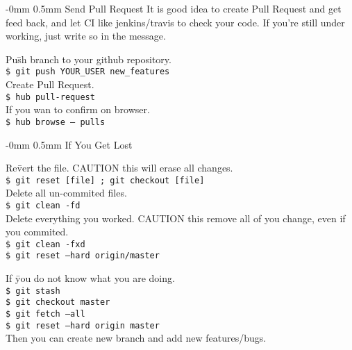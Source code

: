 \documentclass[10pt,landscape]{article}
\makeatletter
\renewcommand{\section}{\@startsection{section}{1}{0mm}%
                                {-0mm} %
                                {0.5mm}%
                                {\normalfont\large\bfseries}}
\makeatother
\begin{document}
\begin{multicols}{2}
\section{Send Pull Request}
\vspace{2.5mm}
It is good idea to create Pull Request and get
feed back, and let CI like jenkins/travis to check your code.
If you're still under working, just write so in the message.
\begin{tabbing}
Pu\=sh branch to your github repository.\\
\> \texttt{\$ git push YOUR\_USER new\_features}\\  
Create Pull Request.\\
\> \texttt{\$ hub pull-request}\\  
If you wan to confirm on browser.\\
\> \texttt{\$ hub browse -- pulls}\\  
\end{tabbing}

\vspace{-2.5mm}
\section{If You Get Lost}

\vspace{2.5mm}
\begin{tabbing}
Re\=vert the file. CAUTION this will erase all changes.\\
\> \texttt{\$ git reset [file] ; git checkout [file]}\\
Delete all un-commited files.\\
\> \texttt{\$ git clean -fd}\\
Delete everything you worked. CAUTION this remove all of
you change, even if you commited.\\
\> \texttt{\$ git clean -fxd}\\
\> \texttt{\$ git reset --hard origin/master}\\
\end{tabbing}

\begin{tabbing}
If \=you do not know what you are doing.\\
\> \texttt{\$ git stash}\\
\> \texttt{\$ git checkout master}\\
\> \texttt{\$ git fetch --all}\\
\> \texttt{\$ git reset --hard origin master}\\
Then you can create new branch and add new features/bugs.
\end{tabbing}


\end{multicols}
\end{document}
